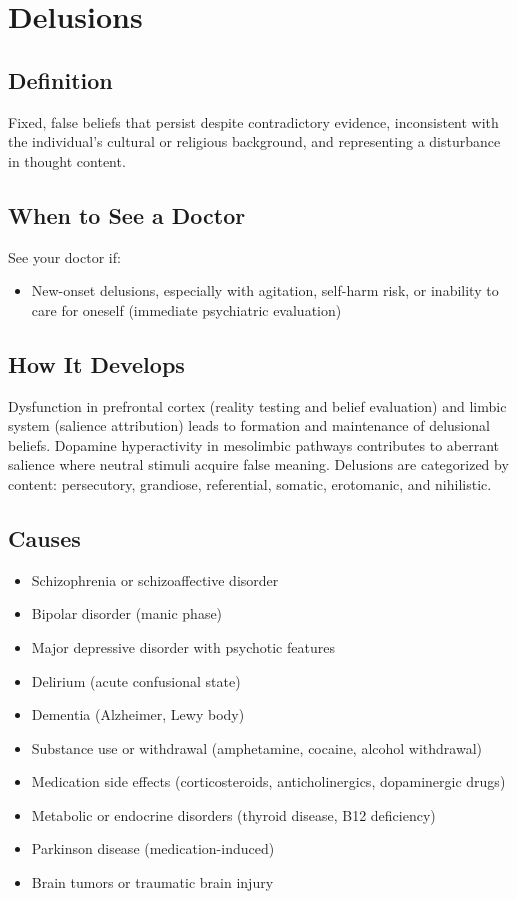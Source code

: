 \chapter{Delusions}

\section*{Definition}
Fixed, false beliefs that persist despite contradictory evidence, inconsistent with the individual's cultural or religious background, and representing a disturbance in thought content.

\section*{When to See a Doctor}
See your doctor if:
\begin{itemize}
  \item New-onset delusions, especially with agitation, self-harm risk, or inability to care for oneself (immediate psychiatric evaluation)
\end{itemize}

\section*{How It Develops}
Dysfunction in prefrontal cortex (reality testing and belief evaluation) and limbic system (salience attribution) leads to formation and maintenance of delusional beliefs. Dopamine hyperactivity in mesolimbic pathways contributes to aberrant salience where neutral stimuli acquire false meaning. Delusions are categorized by content: persecutory, grandiose, referential, somatic, erotomanic, and nihilistic.

\section*{Causes}
\begin{itemize}
  \item Schizophrenia or schizoaffective disorder
  \item Bipolar disorder (manic phase)
  \item Major depressive disorder with psychotic features
  \item Delirium (acute confusional state)
  \item Dementia (Alzheimer, Lewy body)
  \item Substance use or withdrawal (amphetamine, cocaine, alcohol withdrawal)
  \item Medication side effects (corticosteroids, anticholinergics, dopaminergic drugs)
  \item Metabolic or endocrine disorders (thyroid disease, B12 deficiency)
  \item Parkinson disease (medication-induced)
  \item Brain tumors or traumatic brain injury
\end{itemize}

